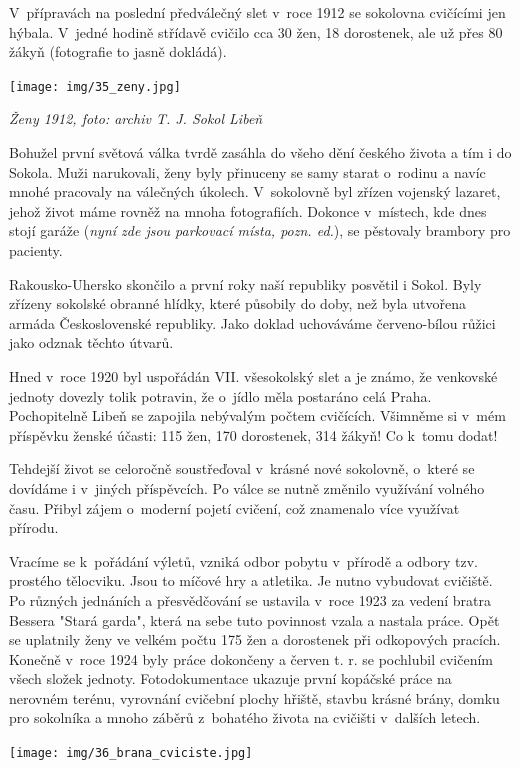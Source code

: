 \documentclass[a5paper, 11pt, twoside]{article}
\begin{document}
V~přípravách na poslední předválečný slet v~roce 1912 se sokolovna
cvičícími jen hýbala. V~jedné hodině střídavě cvičilo cca 30 žen, 18
dorostenek, ale už přes 80 žákyň (fotografie to jasně dokládá).

 \texttt{[image: img/35\_zeny.jpg]}

\textit{Ženy 1912, foto: archiv T. J. Sokol Libeň}

Bohužel první světová válka tvrdě zasáhla do všeho dění českého života a
tím i do Sokola. Muži narukovali, ženy byly přinuceny se samy starat
o~rodinu a navíc mnohé pracovaly na válečných úkolech. V~sokolovně byl
zřízen vojenský lazaret, jehož život máme rovněž na mnoha fotografiích.
Dokonce v~místech, kde dnes stojí garáže (\textit{nyní zde jsou parkovací
místa, pozn. ed.}), se pěstovaly brambory pro pacienty.

Rakousko-Uhersko skončilo a první roky naší republiky posvětil i Sokol.
Byly zřízeny sokolské obranné hlídky, které působily do doby, než byla
utvořena armáda Československé republiky. Jako doklad uchováváme
červeno-bílou růžici jako odznak těchto útvarů.

Hned v~roce 1920 byl uspořádán VII. všesokolský slet a je známo, že
venkovské jednoty dovezly tolik potravin, že o~jídlo měla postaráno celá
Praha. Pochopitelně Libeň se zapojila nebývalým počtem cvičících.
Všimněme si v~mém příspěvku ženské účasti: 115 žen, 170 dorostenek, 314
žákyň! Co k~tomu dodat!

Tehdejší život se celoročně soustřeďoval v~krásné nové sokolovně,
o~které se dovídáme i v~jiných příspěvcích. Po válce se nutně změnilo
využívání volného času. Přibyl zájem o~moderní pojetí cvičení, což
znamenalo více využívat přírodu.

Vracíme se k~pořádání výletů, vzniká odbor pobytu v~přírodě a odbory
tzv. prostého tělocviku. Jsou to míčové hry a atletika. Je nutno
vybudovat cvičiště. Po různých jednáních a přesvědčování se ustavila
v~roce 1923 za vedení bratra Bessera "Stará garda", která na sebe tuto
povinnost vzala a nastala práce. Opět se uplatnily ženy ve velkém počtu
175 žen a dorostenek při odkopových pracích. Konečně v~roce 1924 byly
práce dokončeny a červen t. r. se pochlubil cvičením všech složek
jednoty. Fotodokumentace ukazuje první kopáčské práce na nerovném
terénu, vyrovnání cvičební plochy hřiště, stavbu krásné brány, domku pro
sokolníka a mnoho záběrů z~bohatého života na cvičišti v~dalších letech.

 \texttt{[image: img/36\_brana\_cviciste.jpg]}
\end{document}
